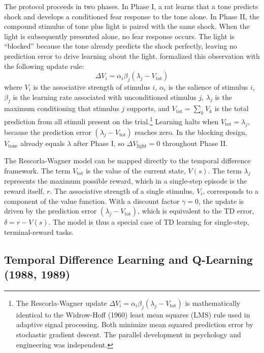The protocol proceeds in two phases. In Phase I, a rat learns that a tone predicts shock and develops a conditioned fear response to the tone alone. In Phase II, the compound stimulus of tone plus light is paired with the same shock. When the light is subsequently presented alone, no fear response occurs. The light is ``blocked'' because the tone already predicts the shock perfectly, leaving no prediction error to drive learning about the light. \citet{RescorlaWagner1972} formalized this observation with the following update rule:
\begin{equation}
\Delta V_i = \alpha_i \beta_j (\lambda_j - V_{\text{tot}})
\end{equation}
where $V_i$ is the associative strength of stimulus $i$, $\alpha_i$ is the salience of stimulus $i$, $\beta_j$ is the learning rate associated with unconditioned stimulus $j$, $\lambda_j$ is the maximum conditioning that stimulus $j$ supports, and $V_{\text{tot}} = \sum_k V_k$ is the total prediction from all stimuli present on the trial.\footnote{The Rescorla-Wagner update $\Delta V_i = \alpha_i \beta_j (\lambda_j - V_{\text{tot}})$ is mathematically identical to the Widrow-Hoff (1960) least mean squares (LMS) rule used in adaptive signal processing. Both minimize mean squared prediction error by stochastic gradient descent. The parallel development in psychology and engineering was independent.} Learning halts when $V_{\text{tot}} = \lambda_j$, because the prediction error $(\lambda_j - V_{\text{tot}})$ reaches zero. In the blocking design, $V_{\text{tone}}$ already equals $\lambda$ after Phase I, so $\Delta V_{\text{light}} = 0$ throughout Phase II.

The Rescorla-Wagner model can be mapped directly to the temporal difference framework. The term $V_{\text{tot}}$ is the value of the current state, $V(s)$. The term $\lambda_j$ represents the maximum possible reward, which in a single-step episode is the reward itself, $r$. The associative strength of a single stimulus, $V_i$, corresponds to a component of the value function. With a discount factor $\gamma=0$, the update is driven by the prediction error $(\lambda_j - V_{\text{tot}})$, which is equivalent to the TD error, $\delta = r - V(s)$. The model is thus a special case of TD learning for single-step, terminal-reward tasks.

\subsection{Temporal Difference Learning and Q-Learning (1988, 1989)}

